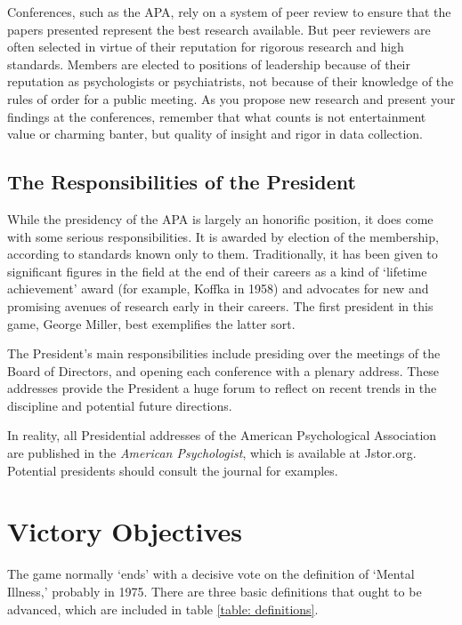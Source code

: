 \begin{refsection}
Conferences, such as the APA, rely on a system of peer review to ensure that the papers presented represent the best research available. But peer reviewers are often selected in virtue of their reputation for rigorous research and high standards. Members are elected to positions of leadership because of their reputation as psychologists or psychiatrists, not because of their knowledge of the rules of order for a public meeting. As you propose new research and present your findings at the conferences, remember that what counts is not entertainment value or charming banter, but quality of insight and rigor in data collection.

\subsection{The Responsibilities of the President}
\label{theresponsibilitiesofthepresident}

While the presidency of the APA is largely an honorific position, it does come with some serious responsibilities. It is awarded by election of the membership, according to standards known only to them. Traditionally, it has been given to significant figures in the field at the end of their careers as a kind of `lifetime achievement' award (for example, Koffka in 1958) and advocates for new and promising avenues of research early in their careers. The first president in this game, George Miller, best exemplifies the latter sort.

The President's main responsibilities include presiding over the meetings of the Board of Directors, and opening each conference with a plenary address. These addresses provide the President a huge forum to reflect on recent trends in the discipline and potential future directions.

In reality, all Presidential addresses of the American Psychological Association are published in the \emph{American Psychologist}, which is available at Jstor.org. Potential presidents should consult the journal for examples.

\section{Victory Objectives}
\label{victoryobjectives}

The game normally `ends' with a decisive vote on the definition of `Mental Illness,' probably in 1975. There are three basic definitions that ought to be advanced, which are included in table \ref{table: definitions}.
 \begin{longtable}[!t]{ | p{2cm} | p{12cm} | }
\hline


\end{longtable}
\end{refsection}
